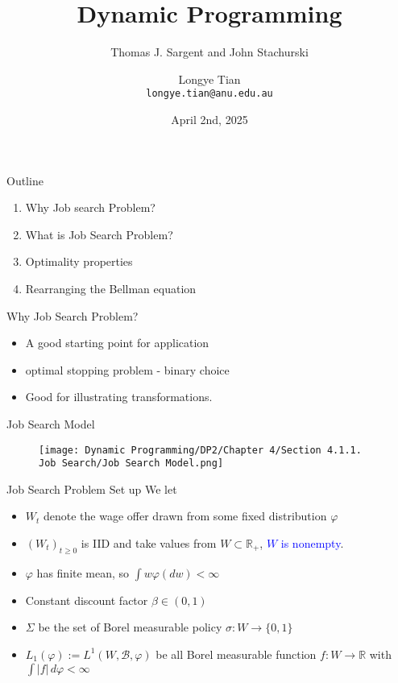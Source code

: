 \documentclass[aspectratio=169]{beamer} %
\title[DP2]{Dynamic Programming}
\subtitle{Thomas J. Sargent and John Stachurski}
\author[Longye]{Longye Tian \\ \texttt{longye.tian@anu.edu.au}}
\institute[ANU]{Australian National University\\ School of Economics}
\date{April 2nd, 2025}
\begin{document}
\begin{frame}
  \titlepage
\end{frame}

\begin{frame}{Outline}
  \begin{enumerate}
      \item Why Job search Problem?
      \item What is Job Search Problem?
      \item Optimality properties
      \item Rearranging the Bellman equation
  \end{enumerate}
\end{frame}

\begin{frame}{Why Job Search Problem?}
    \begin{itemize}
        \item A good starting point for application 
        \item optimal stopping problem - binary choice
        \item Good for illustrating transformations.
    \end{itemize}
\end{frame}


\begin{frame}{Job Search Model}
    \begin{figure}
        \centering
        \texttt{[image: Dynamic Programming/DP2/Chapter 4/Section 4.1.1. Job Search/Job Search Model.png]}
    \end{figure}
\end{frame}


\begin{frame}{Job Search Problem Set up}
    We let 
    \begin{itemize}
        \item $W_t$ denote the wage offer drawn from some fixed distribution $\varphi$
        \item $(W_t)_{t\ge 0}$ is IID and take values from $W\subset \mathbb{R}_+$, \textcolor{blue}{$W$ is nonempty}.
        \item $\varphi$ has finite mean, so $\int w\varphi(dw)<\infty$
        \item Constant discount factor $\beta\in(0,1)$
        \item $\Sigma$ be the set of Borel measurable policy $\sigma: W\to \{0,1\}$
         \item $L_1(\varphi):= L^1(W,\mathcal{B}, \varphi)$ be all Borel measurable function $f:W\to \mathbb{R}$ with $\int|f|\,d\varphi<\infty$
    \end{itemize}
\end{frame}
\end{document}
